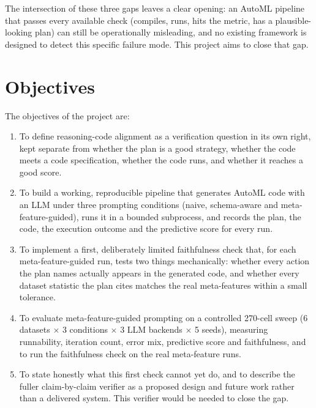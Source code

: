 The intersection of these three gaps leaves a clear opening: an
AutoML pipeline that passes every available check (compiles, runs,
hits the metric, has a plausible-looking plan) can still be
operationally misleading, and no existing framework is designed to
detect this specific failure mode. This project aims to close that
gap.

\needspace{0.33\textheight}
\section{Objectives}

The objectives of the project are:

\begin{enumerate}
    \item To define reasoning-code alignment as a verification
    question in its own right, kept separate from whether the plan is
    a good strategy, whether the code meets a code specification,
    whether the code runs, and whether it reaches a good score.

    \item To build a working, reproducible pipeline that generates
    AutoML code with an LLM under three prompting conditions (naive,
    schema-aware and meta-feature-guided), runs it in a bounded
    subprocess, and records the plan, the code, the execution outcome
    and the predictive score for every run.

    \item To implement a first, deliberately limited faithfulness
    check that, for each meta-feature-guided run, tests two things
    mechanically: whether every action the plan names actually appears
    in the generated code, and whether every dataset statistic the
    plan cites matches the real meta-features within a small
    tolerance.

    \item To evaluate meta-feature-guided prompting on a controlled
    270-cell sweep (6 datasets $\times$ 3 conditions $\times$ 3 LLM
    backends $\times$ 5 seeds), measuring runnability, iteration count,
    error mix, predictive score and faithfulness, and to run the
    faithfulness check on the real meta-feature runs.

    \item To state honestly what this first check cannot yet do, and
    to describe the fuller claim-by-claim verifier as a proposed
    design and future work rather than a delivered system. This verifier
    would be needed to close the gap.
\end{enumerate}

